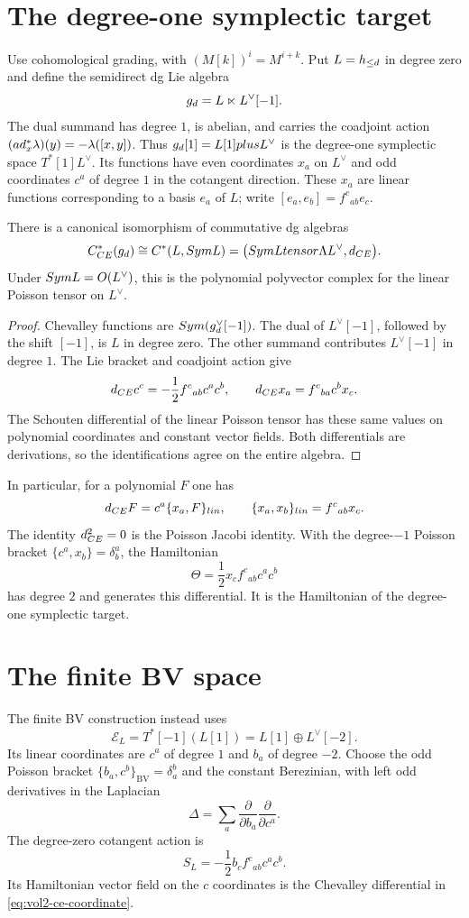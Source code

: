 \section{The degree-one symplectic target}
Use cohomological grading, with $(M[k])^i=M^{i+k}$.
Put $L=h_{\le d}$ in degree zero and define the semidirect dg Lie algebra
\[
 g_d=L\ltimes L^\vee[-1].
\]
The dual summand has degree $1$, is abelian, and carries the coadjoint
action $(ad_x^*\lambda)(y)=-\lambda([x,y])$.
Thus $g_d[1]=L[1]plus L^\vee$ is the degree-one symplectic
space $T^*[1]L^\vee$.  Its functions have even coordinates $x_a$ on
$L^\vee$ and odd coordinates $c^a$ of degree $1$ in the cotangent
direction.  These $x_a$ are linear functions corresponding to a basis
$e_a$ of $L$; write $[e_a,e_b]=f^c{}_{ab}e_c$.

\begin{proposition}
There is a canonical isomorphism of commutative dg algebras
\[
 C^*_{CE}(g_d)
 \cong C^*(L,Sym L)
 =\bigl(Sym Ltensor\Lambda L^\vee,d_{CE}\bigr).
\]
Under $Sym L=O(L^\vee)$, this is the polynomial polyvector
complex for the linear Poisson tensor on $L^\vee$.
\end{proposition}
\begin{proof}
Chevalley functions are $Sym(g_d^\vee[-1])$.
The dual of $L^\vee[-1]$, followed by the shift $[-1]$, is $L$ in
degree zero.  The other summand contributes $L^\vee[-1]$ in degree
$1$.  The Lie bracket and coadjoint action give
\begin{equation}\label{eq:vol2-ce-coordinate}
 d_{CE}c^c=-\frac12f^c{}_{ab}c^ac^b,
 \qquad
 d_{CE}x_a=f^c{}_{ba}c^b x_c.
\end{equation}
The Schouten differential of the linear Poisson tensor has these same
values on polynomial coordinates and constant vector fields.
Both differentials are derivations, so the identifications agree on
the entire algebra.
\end{proof}

In particular, for a polynomial $F$ one has
\[
 d_{CE}F=c^a\{x_a,F\}_{lin},
 \qquad \{x_a,x_b\}_{lin}=f^c{}_{ab}x_c.
\]
The identity $d_{CE}^2=0$ is the Poisson Jacobi identity.
With the degree-$-1$ Poisson bracket $\{c^a,x_b\}=\delta^a_b$,
the Hamiltonian
\[
 \Theta=\frac12x_cf^c{}_{ab}c^ac^b
\]
has degree $2$ and generates this differential.
It is the Hamiltonian of the degree-one symplectic target.

\section{The finite BV space}
The finite BV construction instead uses
\[
 \mathcal E_L=T^*[-1](L[1])=L[1]\oplus L^\vee[-2].
\]
Its linear coordinates are $c^a$ of degree $1$ and $b_a$ of degree
$-2$.  Choose the odd Poisson bracket $\{b_a,c^b\}_{\mathrm{BV}}
=\delta_a^b$ and the constant Berezinian, with left odd derivatives
in the Laplacian
\[
 \Delta=\sum_a\frac{\partial}{\partial b_a}
                    \frac{\partial}{\partial c^a}.
\]
The degree-zero cotangent action is
\[
 S_L=-\frac12b_cf^c{}_{ab}c^ac^b.
\]
Its Hamiltonian vector field on the $c$ coordinates is the Chevalley
differential in \eqref{eq:vol2-ce-coordinate}.

